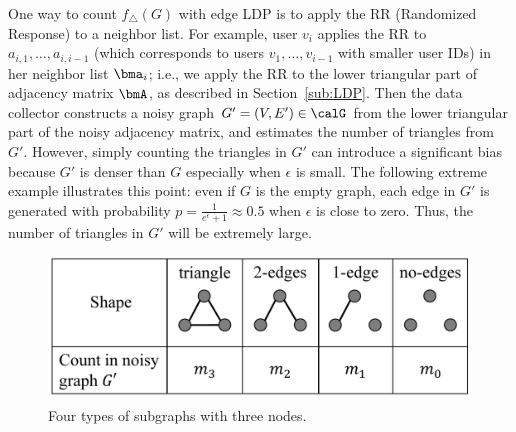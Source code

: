 One way to count $f_\triangle(G)$ with edge LDP is 
to apply the RR (Randomized Response) 
to a neighbor list. 
For example, user $v_i$ applies the RR to 
$a_{i,1}, \ldots, a_{i,i-1}$ (which corresponds to users $v_1, \ldots, v_{i-1}$ with smaller user IDs) in her neighbor list $\bma_i$; i.e., 
we apply the RR to the lower triangular part of adjacency matrix $\bmA$, as described in Section~\ref{sub:LDP}. 
Then the data collector constructs a noisy graph $G'=(V,E') \in \calG$ from the lower triangular part of the noisy adjacency matrix, and 
estimates the number of triangles 
from $G'$. 
However, 
simply counting
the triangles in 
$G'$ 
can introduce a significant bias 
because $G'$ is denser than $G$ especially when $\epsilon$ is small. 
The following extreme example illustrates this point: 
even if $G$ is the empty graph, 
each edge in $G'$ is generated with probability $p = \frac{1}{e^\epsilon+1} \approx 0.5$ when $\epsilon$ is close to zero. 
Thus, the 
number of triangles in 
$G'$ 
will be extremely large. 

\begin{figure}
\centering
\includegraphics[width=0.9\linewidth]{fig/triplet_shape.pdf}
\vspace{-4mm}
\caption{Four types of subgraphs with three nodes.}
\label{fig:triplet_shape}
\end{figure}

